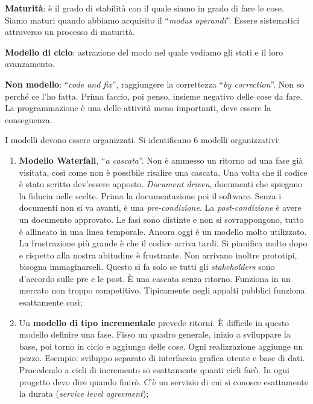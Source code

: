 \textbf{Maturità}: è il grado di stabilità con il quale siamo in grado di fare le cose. Siamo maturi quando abbiamo acquisito il ``\textit{modus operandi}''. Essere sistematici attraverso un processo di maturità.

\textbf{Modello di ciclo}: astrazione del modo nel quale vediamo gli stati e il loro avanzamento.

\textbf{Non modello}: ``\textit{code and fix}'', raggiungere la correttezza ``\textit{by correction}''. Non so perché ce l'ho fatta. Prima faccio, poi penso, insieme negativo delle cose da fare. La programmazione è una delle attività meno importanti, deve essere la conseguenza.

I modelli devono essere organizzati. Si identificano 6 modelli organizzativi:

\begin{enumerate}

	\item \textbf{Modello Waterfall}, ``\textit{a cascata}''. Non è ammesso un ritorno ad una fase già visitata, così come non è possibile risalire una cascata. Una volta che il codice è stato scritto dev'essere apposto. \textit{Document driven}, documenti che spiegano la fiducia nelle scelte. Prima la documentazione poi il software. Senza i documenti non si va avanti, è una \textit{pre-condizione}. La \textit{post-condizione} è avere un documento approvato. Le fasi sono distinte e non si sovrappongono, tutto è allineato in una linea temporale. Ancora oggi è un modello molto utilizzato. La frustrazione più grande è che il codice arriva tardi. Si pianifica molto dopo e rispetto alla nostra abitudine è frustrante. Non arrivano inoltre prototipi, bisogna immaginarseli. Questo si fa solo se tutti gli \textit{stakeholders} sono d'accordo sulle pre e le post. È una cascata senza ritorno. Funziona in un mercato non troppo competitivo. Tipicamente negli appalti pubblici funziona esattamente così;
	
	\item Un \textbf{modello di tipo incrementale} prevede ritorni. È difficile in questo modello definire una fase. Fisso un quadro generale, inizio a sviluppare la base, poi torno in ciclo e aggiungo delle cose. Ogni realizzazione aggiunge un pezzo. Esempio: sviluppo separato di interfaccia grafica utente e base di dati. Procedendo a cicli di incremento so esattamente quanti cicli farò. In ogni progetto devo dire quando finirò. C'è un servizio di cui si conosce esattamente la durata (\textit{service level agreement});
	

\end{enumerate}
